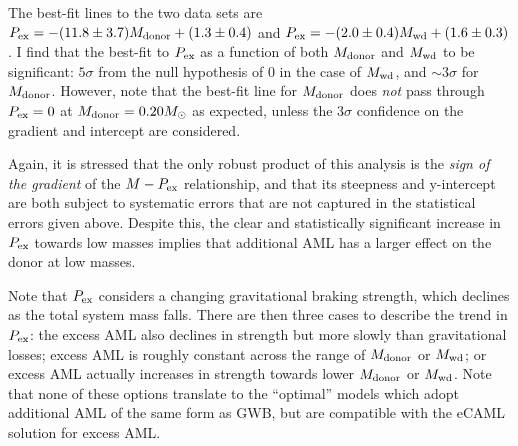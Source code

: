  The best-fit lines to the two data sets are $P_{\rm ex} = -(11.8\pm3.7) M_{\rm donor} + (1.3\pm0.4)$ and $P_{\rm ex} = -(2.0\pm0.4) M_{\rm wd} + (1.6\pm0.3)$.
I find that the best-fit to $P_{\rm ex}$ as a function of both $M_{\rm donor}$ and $M_{\rm wd}$ to be significant: $5\sigma$ from the null hypothesis of 0 in the case of $M_{\rm wd}$, and $\sim 3\sigma$ for $M_{\rm donor}$.
 However, note that the best-fit line for $M_{\rm donor}$ does \textit{not} pass through $P_{\rm ex} = 0$ at $M_{\rm donor} = 0.20 M_\odot$ as expected, unless the $3\sigma$ confidence on the gradient and intercept are considered.

Again, it is stressed that the only robust product of this analysis is the \textit{sign of the gradient} of the $M - P_{\rm ex}$ relationship, and that its steepness and y-intercept are both subject to systematic errors that are not captured in the statistical errors given above. Despite this, the clear and statistically significant increase in $P_{\rm ex}$ towards low masses implies that additional AML has a larger effect on the donor at low masses.

Note that $P_{\rm ex}$ considers a changing gravitational braking strength, which declines as the total system mass falls.
There are then three cases to describe the trend in $P_{\rm ex}$: the excess AML also declines in strength but more slowly than gravitational losses; excess AML is roughly constant across the range of $M_{\rm donor}$ or $M_{\rm wd}$; or excess AML actually increases in strength towards lower $M_{\rm donor}$ or $M_{\rm wd}$. Note that none of these options translate to the ``optimal'' \citet{knigge11} models which adopt additional AML of the same form as GWB, but are compatible with the eCAML solution for excess AML.



